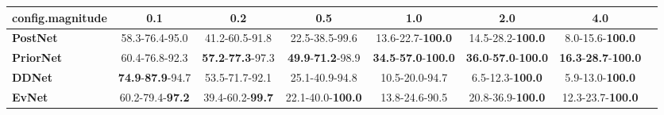 \begin{tabular}{lccccccc}
\toprule
\textbf{config.magnitude} &                               0.1 &                               0.2 &                               0.5 &                                         1.0 &                                         2.0 &                                         4.0 \\
\midrule
\textbf{PostNet } &                    58.3-76.4-95.0 &                    41.2-60.5-91.8 &                    22.5-38.5-99.6 &                    13.6-22.7-\textbf{100.0} &                    14.5-28.2-\textbf{100.0} &                     8.0-15.6-\textbf{100.0} \\
\textbf{PriorNet} &                    60.4-76.8-92.3 &  \textbf{57.2}-\textbf{77.3}-97.3 &  \textbf{49.9}-\textbf{71.2}-98.9 &  \textbf{34.5}-\textbf{57.0}-\textbf{100.0} &  \textbf{36.0}-\textbf{57.0}-\textbf{100.0} &  \textbf{16.3}-\textbf{28.7}-\textbf{100.0} \\
\textbf{DDNet   } &  \textbf{74.9}-\textbf{87.9}-94.7 &                    53.5-71.7-92.1 &                    25.1-40.9-94.8 &                              10.5-20.0-94.7 &                     6.5-12.3-\textbf{100.0} &                     5.9-13.0-\textbf{100.0} \\
\textbf{EvNet   } &           60.2-79.4-\textbf{97.2} &           39.4-60.2-\textbf{99.7} &          22.1-40.0-\textbf{100.0} &                              13.8-24.6-90.5 &                    20.8-36.9-\textbf{100.0} &                    12.3-23.7-\textbf{100.0} \\
\bottomrule
\end{tabular}
